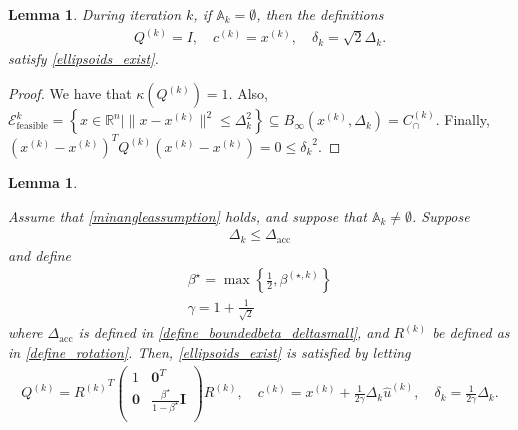 \documentclass{article}
\newtheorem{lemma}[theorem]{Lemma}
\theoremstyle{case}
\newcommand{\dacc}{{\Delta_{\text{acc}}}}
\newcommand{\xk}{{x^{(k)}}}
\newcommand{\Rn}{\mathbb R^n}
\newcommand{\dk}{\Delta_k}
\newcommand{\qk}{{Q^{(k)}}}
\newcommand{\ck}{{c^{(k)}}}
\newcommand{\sdk}{{\delta_k}}
\newcommand{\unshiftedellipsoid}{{\mathcal E^k_{\text{feasible}}}}
\newcommand{\rotk}{{R^{(k)}}}
\newcommand{\huk}{{{\hat u}^{(k)}}}
\newcommand{\bsk}{{\beta^{(\star, k)}}}
\newcommand{\capcones}{{C^{(k)}_{\cap}}}
\newcommand{\tr}{{ B_{\infty}\left(\xk, \dk\right) }}
\newcommand{\activeconstraintsk}{{\mathbb A_{k}}}
\begin{document}
\begin{lemma}
\label{ellsoid_is_suitable_theorem_p1}
During iteration $k$, if $\activeconstraintsk = \emptyset$, then the definitions
\begin{align*}
\qk = I, \quad \ck = \xk, \quad \sdk = \sqrt{2} \dk.
\end{align*}
satisfy \cref{ellipsoids_exist}.
\end{lemma}
\begin{proof}
We have that $\kappa(\qk) = 1$.
Also, $\unshiftedellipsoid = \left\{x \in \Rn | \|x - \xk\|^2 \le \dk^2 \right\} \subseteq \tr = \capcones$.
Finally, $(\xk - \xk)^T\qk(\xk - \xk) = 0 \le \sdk^2$.
\end{proof}

\begin{lemma}
\label{ellsoid_is_suitable_theorem_p2}

Assume that \cref{minangleassumption} holds, and suppose that $\activeconstraintsk \ne \emptyset$.
Suppose
\begin{align}
\dk \le \dacc\label{accuracy_small_delta}
\end{align}
and define
\begin{align}
\beta^{\star} = \max\left\{\frac 1 2, \bsk\right\} \\
\gamma = 1 + \frac 1 {\sqrt 2}
\end{align}
where $\dacc$ is defined in \cref{define_boundedbeta_deltasmall}, and $\rotk$ be defined as in \cref{define_rotation}.
Then, \cref{ellipsoids_exist} is satisfied by letting
\begin{align*}
\qk = \rotk^T \begin{pmatrix}
1 & \boldsymbol0^T \\
\boldsymbol 0 & \frac{\beta^{\star}}{1 - \beta^{\star}} \boldsymbol I \\
\end{pmatrix} \rotk, \quad
\ck = \xk  + \frac 1 {2\gamma} \dk\huk, \quad
\sdk = \frac 1 {2\gamma} \dk.
\end{align*}
\end{lemma}
\end{document}
